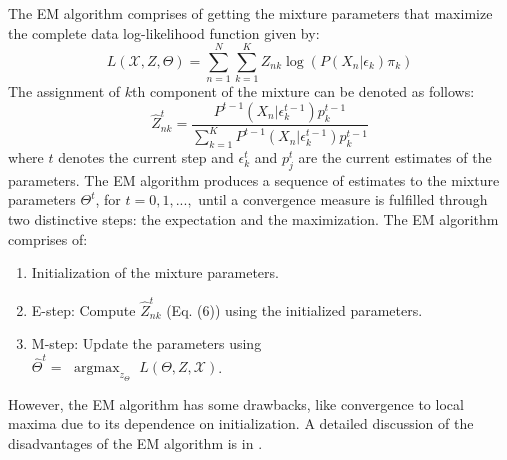 \documentclass[conference]{IEEEtran}
\DeclareMathOperator*{\argmax}{argmax} %
\begin{document}
The EM algorithm comprises of getting the mixture parameters that maximize the complete data log-likelihood function given by:
\begin{equation}
    L(\mathcal{X}, Z, \Theta) = \sum_{n = 1}^{N}\sum_{k=1}^{K} Z_{nk}\log(P(X_n|\epsilon_k)\pi_k)
\end{equation}
The assignment of $k$th component of the mixture can be denoted as follows\cite{b9}:
\begin{equation}
    \hat{Z}_{nk}^t = \frac{P^{t-1}(X_n|\epsilon_k^{t-1})p_k^{t-1}}{\sum_{k=1}^{K} P^{t-1}(X_n|\epsilon_k^{t-1}) p_k^{t-1}}
\end{equation}
where $t$ denotes the current step and $\epsilon_k^t$ and $p_j^t$ are the current estimates of the parameters.
The EM algorithm produces a sequence of estimates to the mixture parameters $\Theta^t$, for $t=0,1,...,$ until a convergence measure is fulfilled through two distinctive steps: the expectation and the maximization. The EM algorithm comprises of:
\begin{enumerate}
    \item Initialization of the mixture parameters.
    \item E-step: Compute $\hat{Z}^t_{nk}$ (Eq. (6)) using the initialized
    parameters.
    \item M-step: Update the parameters using \\
        $\hat{\Theta}^t =$ $\argmax_{z_{\Theta}}$ $L(\Theta, Z, \mathcal{X})$.
\end{enumerate}

However, the EM algorithm has some drawbacks, like convergence to local maxima due to its dependence on initialization. 
A detailed discussion of the disadvantages of the EM algorithm is in \cite{b1}.

\end{document}
